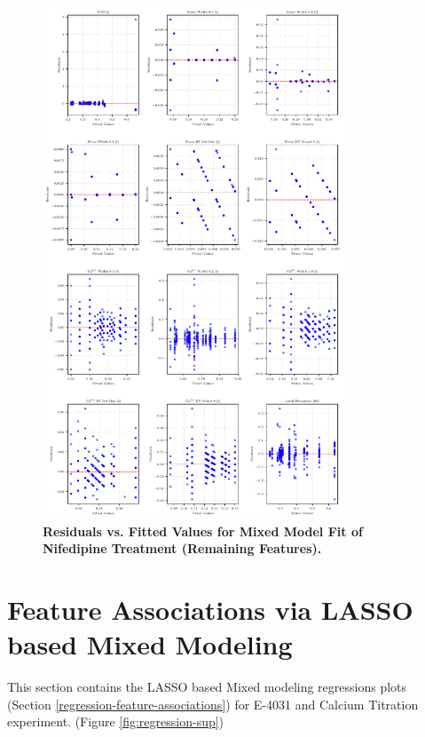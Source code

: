 \documentclass{report}
\begin{document}
    \begin{figure}[H]
        \centering
        \includegraphics[width=0.8\textwidth, keepaspectratio]{plots/chapter_5/nifedipine/resid_mixed_subset_12.pdf}
        \caption[Residuals vs. Fitted Values for Mixed Model Fit of Nifedipine Treatment (Remaining Features)]{\textbf{Residuals vs. Fitted Values for Mixed Model Fit of Nifedipine Treatment (Remaining Features).}}
        \label{fig:nifedipine-remaining-resid}
    \end{figure}

    \section{Feature Associations via LASSO based Mixed Modeling}
    \label{feature-association-e4031-ca}

    This section contains the LASSO based Mixed modeling regressions plots (Section \ref{regression-feature-associations}) for E-4031 and Calcium Titration experiment. (Figure \ref{fig:regression-sup})
\end{document}
